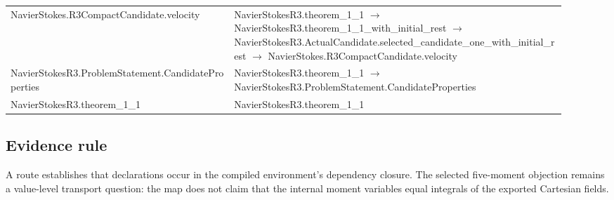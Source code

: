 \begin{longtable}{p{0.37\linewidth}p{0.55\linewidth}}
NavierStokes.R3CompactCandidate.velocity & NavierStokesR3.theorem\_1\_1 $\to$ NavierStokesR3.theorem\_1\_1\_with\_initial\_rest $\to$ NavierStokesR3.ActualCandidate.selected\_candidate\_one\_with\_initial\_rest $\to$ NavierStokes.R3CompactCandidate.velocity\\
NavierStokesR3.ProblemStatement.CandidateProperties & NavierStokesR3.theorem\_1\_1 $\to$ NavierStokesR3.ProblemStatement.CandidateProperties\\
NavierStokesR3.theorem\_1\_1 & NavierStokesR3.theorem\_1\_1\\
\end{longtable}
\subsection{Evidence rule}
A route establishes that declarations occur in the compiled environment's dependency closure. The selected five-moment objection remains a value-level transport question: the map does not claim that the internal moment variables equal integrals of the exported Cartesian fields.
